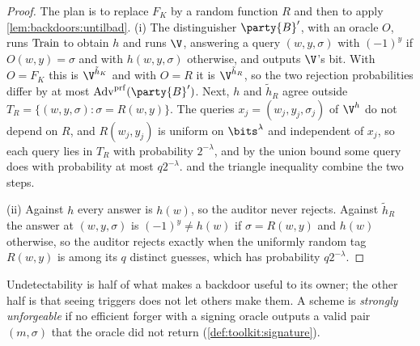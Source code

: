 \begin{refsection}
\begin{proof}
The plan is to replace $F_K$ by a random function $R$ and then to apply \cref{lem:backdoors:untilbad}. (i) The distinguisher $\party{B}'$, with an oracle $O$, runs $\mathrm{Train}$ to obtain $h$ and runs $\V$, answering a query $(w,y,\sigma)$ with $(-1)^y$ if $O(w,y)=\sigma$ and with $h(w,y,\sigma)$ otherwise, and outputs $\V$'s bit. With $O=F_K$ this is $\V^{\tilde h_K}$ and with $O=R$ it is $\V^{\tilde h_R}$, so the two rejection probabilities differ by at most $\backdoorsAdv^{\mathrm{prf}}(\party{B}')$. Next, $h$ and $\tilde h_R$ agree outside $T_R=\{(w,y,\sigma)\colon\sigma=R(w,y)\}$. The queries $x_j=(w_j,y_j,\sigma_j)$ of $\V^h$ do not depend on $R$, and $R(w_j,y_j)$ is uniform on $\bits^\lambda$ and independent of $x_j$, so each query lies in $T_R$ with probability $2^{-\lambda}$, and by the union bound some query does with probability at most $q2^{-\lambda}$.  and the triangle inequality combine the two steps.

(ii) Against $h$ every answer is $h(w)$, so the auditor never rejects. Against $\tilde h_R$ the answer at $(w,y,\sigma)$ is $(-1)^y\ne h(w)$ if $\sigma=R(w,y)$ and $h(w)$ otherwise, so the auditor rejects exactly when the uniformly random tag $R(w,y)$ is among its $q$ distinct guesses, which has probability $q2^{-\lambda}$.
\end{proof}

Undetectability is half of what makes a backdoor useful to its owner; the other half is that seeing triggers does not let others make them. A scheme is \emph{strongly unforgeable} if no efficient forger with a signing oracle outputs a valid pair $(m,\sigma)$ that the oracle did not return (\cref{def:toolkit:signature}).



\end{refsection}

